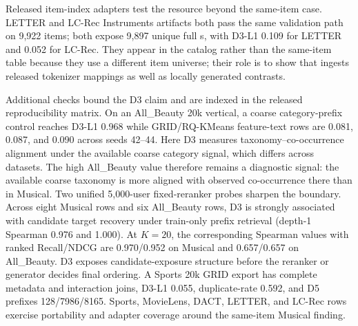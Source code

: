 Released item-index adapters test the resource beyond the same-item case.
LETTER and LC-Rec Instruments artifacts both pass the same validation path on
9,922 items; both expose 9,897 unique full \sid{}s, with D3-L1 0.109 for LETTER
and 0.052 for LC-Rec. They appear in the catalog rather than the same-item
table because they use a different item universe; their role is to show that
\tool ingests released tokenizer mappings as well as locally generated
contrasts.

Additional checks bound the D3 claim and are indexed in the released
reproducibility matrix. On an All\_Beauty 20k vertical, a coarse
category-prefix control reaches D3-L1 0.968 while GRID/RQ-KMeans feature-text
rows are 0.081, 0.087, and 0.090 across seeds 42--44. Here D3 measures
taxonomy--co-occurrence alignment under the available coarse category signal,
which differs across datasets. The high All\_Beauty value therefore remains a diagnostic signal:
the available coarse taxonomy is more aligned with observed co-occurrence there
than in Musical. Two unified 5,000-user fixed-reranker probes sharpen the
boundary. Across eight Musical rows and six All\_Beauty rows, D3 is strongly
associated with candidate target recovery under train-only prefix retrieval
(depth-1 Spearman 0.976 and 1.000). At \(K=20\), the corresponding Spearman
values with ranked Recall/NDCG are 0.970/0.952 on Musical and 0.657/0.657 on
All\_Beauty. D3 exposes candidate-exposure structure before the reranker or
generator decides final ordering. A Sports 20k GRID export has
complete metadata and interaction joins, D3-L1 0.055, duplicate-\sid rate
0.592, and D5 prefixes 128/7986/8165. Sports, MovieLens, DACT, LETTER, and
LC-Rec rows exercise portability and adapter coverage around the same-item
Musical finding.
